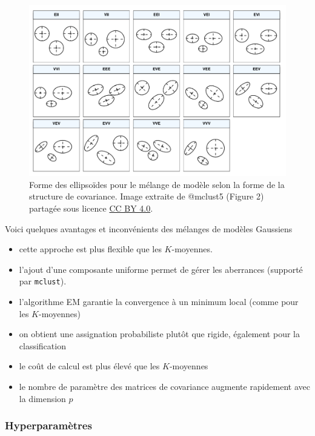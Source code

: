 \documentclass[
  11pt,
  letterpaper,
]{scrbook}
\providecommand{\tightlist}{%
  \setlength{\itemsep}{0pt}\setlength{\parskip}{0pt}}\usepackage{longtable,booktabs,array}
\theoremstyle{definition}
\theoremstyle{remark}
\begin{document}
\begin{figure}[ht!]

{\centering \includegraphics[width=1\textwidth,height=\textheight]{./figures/mclust5-parametrization.png}

}

\caption{\label{fig-modeles}Forme des ellipsoïdes pour le mélange de
modèle selon la forme de la structure de covariance. Image extraite de
@mclust5 (Figure 2) partagée sous licence
\href{https://creativecommons.org/licenses/by/4.0/}{CC BY 4.0}.}

\end{figure}

Voici quelques avantages et inconvénients des mélanges de modèles
Gaussiens

\begin{itemize}
\tightlist
\item
  cette approche est plus flexible que les \(K\)-moyennes.
\item
  l'ajout d'une composante uniforme permet de gérer les aberrances
  (supporté par \texttt{mclust}).
\item
  l'algorithme EM garantie la convergence à un minimum local (comme pour
  les \(K\)-moyennes)
\item
  on obtient une assignation probabiliste plutôt que rigide, également
  pour la classification
\item
  le coût de calcul est plus élevé que les \(K\)-moyennes
\item
  le nombre de paramètre des matrices de covariance augmente rapidement
  avec la dimension \(p\)
\end{itemize}

\hypertarget{hyperparamuxe8tres}{%
\subsubsection{Hyperparamètres}\label{hyperparamuxe8tres}}
\end{document}
